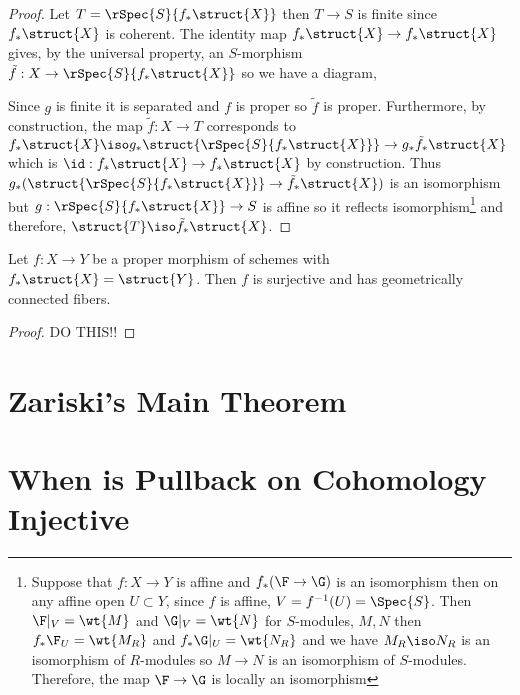 \documentclass[12pt]{article}
\begin{document}
\begin{proof}
Let $T = \rSpec{S}{f_* \struct{X}}$ then $T \to S$ is finite since $f_* \struct{X}$ is coherent. The identity map $f_* \struct{X} \to f_* \struct{X}$ gives, by the universal property, an $S$-morphism $\tilde{f} : X \to \rSpec{S}{f_* \struct{X}}$ so we have a diagram, 
\begin{center}
\end{center}
Since $g$ is finite it is separated and $f$ is proper so $\tilde{f}$ is proper. Furthermore, by construction, the map $\tilde{f} : X \to T$ corresponds to $f_* \struct{X} \iso g_* \struct{\rSpec{S}{f_* \struct{X}}} \to g_* \tilde{f}_* \struct{X}$ which is $\id : f_* \struct{X} \to f_* \struct{X}$ by construction. Thus $g_* ( \struct{\rSpec{S}{f_* \struct{X}}} \to \tilde{f}_* \struct{X})$ is an isomorphism but $g : \rSpec{S}{f_* \struct{X}} \to S$ is affine so it reflects isomorphism\footnote{Suppose that $f : X \to Y$ is affine and $f_* (\F \to \G)$ is an isomorphism then on any affine open $U \subset Y$, since $f$ is affine, $V = f^{-1}(U) = \Spec{S}$. Then $\F|_V = \wt{M}$ and $\G|_V = \wt{N}$ for $S$-modules, $M, N$ then $f_* \F_U = \wt{M_R}$ and $f_* \G |_U = \wt{N_R}$ and we have $M_R \iso N_R$ is an isomorphism of $R$-modules so $M \to N$ is an isomorphism of $S$-modules. Therefore, the map $\F \to \G$ is locally an isomorphism} and therefore, $\struct{T} \iso \tilde{f}_* \struct{X}$.
\end{proof}

\begin{theorem}[Zariski]
Let $f : X \to Y$ be a proper morphism of schemes with $f_* \struct{X} = \struct{Y}$. Then $f$ is surjective and has geometrically connected fibers. 
\end{theorem}

\begin{proof}
DO THIS!!
\end{proof}

\section{Zariski's Main Theorem}

\section{When is Pullback on Cohomology Injective}
\end{document}
